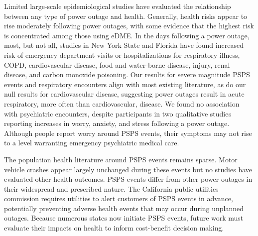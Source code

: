 \documentclass[../main.tex]{subfiles}
\begin{document}
Limited large-scale epidemiological studies have evaluated the relationship between any type of power outage and health.\citep{casey2020power, northrop2024power, lin2021immediate, mcbrien2025, molinari2017s, zhang2020power}  Generally, health risks appear to rise moderately following power outages, with some evidence that the highest risk is concentrated among those using eDME.\citep{casey2020power, northrop2024power, lin2021immediate, mcbrien2025, molinari2017s, andresen2023understanding} In the days following a power outage, most, but not all,\citep{lin2021immediate, do2025impact} studies in New York State and Florida have found increased risk of emergency department visits or hospitalizations for respiratory illness,\citep{dominianni2018health, lin2024joint, deng2022independent} COPD,\citep{zhang2020power, lin2024joint} cardiovascular disease,\citep{deng2022independent} food and water-borne disease,\citep{deng2022independent} injury,\citep{northrop2024power} renal disease,\citep{dominianni2018health} and carbon monoxide poisoning.\citep{northrop2024power} Our results for severe magnitude PSPS events and respiratory encounters align with most existing literature, as do our null results for cardiovascular disease,\citep{lin2021immediate, do2025impact} suggesting power outages result in acute respiratory, more often than cardiovascular, disease. We found no association with psychiatric encounters, despite participants in two qualitative studies reporting increases in worry, anxiety, and stress following a power outage.\citep{ibrahim2016erratic} Although people report worry around PSPS events,\citep{WONGPARODI2022102495} their symptoms may not rise to a level warranting emergency psychiatric medical care. 

The population health literature around PSPS events remains sparse.\citep{WONGPARODI2022102495, harding2025a} Motor vehicle crashes appear largely unchanged during these events\citep{harding2025a} but no studies have evaluated other health outcomes. PSPS events differ from other power outages in their widespread and prescribed nature. The California public utilities commission requires utilities to alert customers of PSPS events in advance, potentially preventing adverse health events that may occur during unplanned outages. Because numerous states now initiate PSPS events, future work must evaluate their impacts on health to inform cost-benefit decision making. 
\end{document}
